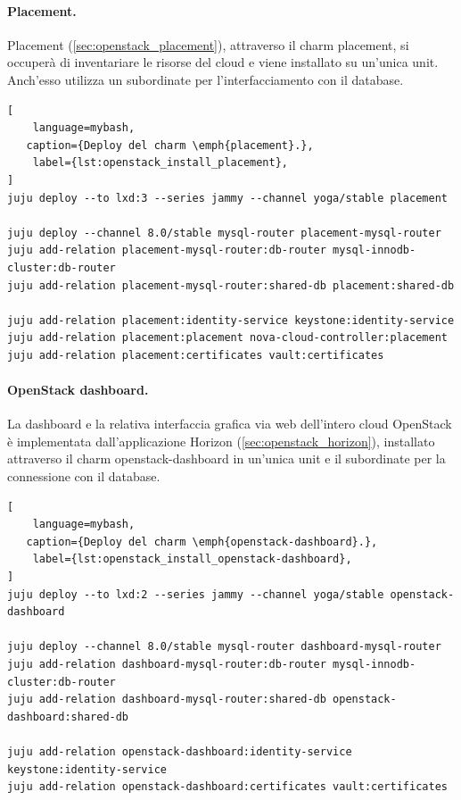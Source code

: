 \paragraph{Placement.}
Placement (\cref{sec:openstack_placement}), attraverso il charm placement, si occuperà di inventariare le risorse del cloud e viene installato su un'unica unit.
% 
Anch'esso utilizza un subordinate per l'interfacciamento con il database.
\begin{lstlisting}[
    language=mybash, 
   caption={Deploy del charm \emph{placement}.},
    label={lst:openstack_install_placement},
]
juju deploy --to lxd:3 --series jammy --channel yoga/stable placement

juju deploy --channel 8.0/stable mysql-router placement-mysql-router
juju add-relation placement-mysql-router:db-router mysql-innodb-cluster:db-router
juju add-relation placement-mysql-router:shared-db placement:shared-db

juju add-relation placement:identity-service keystone:identity-service
juju add-relation placement:placement nova-cloud-controller:placement
juju add-relation placement:certificates vault:certificates
\end{lstlisting}



\paragraph{OpenStack dashboard.}
La dashboard e la relativa interfaccia grafica via web dell'intero cloud OpenStack è implementata dall'applicazione Horizon (\cref{sec:openstack_horizon}), installato attraverso il charm openstack-dashboard in un'unica unit e il subordinate per la connessione con il database.
\begin{lstlisting}[
    language=mybash, 
   caption={Deploy del charm \emph{openstack-dashboard}.},
    label={lst:openstack_install_openstack-dashboard},
]
juju deploy --to lxd:2 --series jammy --channel yoga/stable openstack-dashboard

juju deploy --channel 8.0/stable mysql-router dashboard-mysql-router
juju add-relation dashboard-mysql-router:db-router mysql-innodb-cluster:db-router
juju add-relation dashboard-mysql-router:shared-db openstack-dashboard:shared-db

juju add-relation openstack-dashboard:identity-service keystone:identity-service
juju add-relation openstack-dashboard:certificates vault:certificates
\end{lstlisting}



